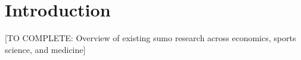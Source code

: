 \section{Introduction}

[TO COMPLETE: Overview of existing sumo research across economics, sports science, and medicine]